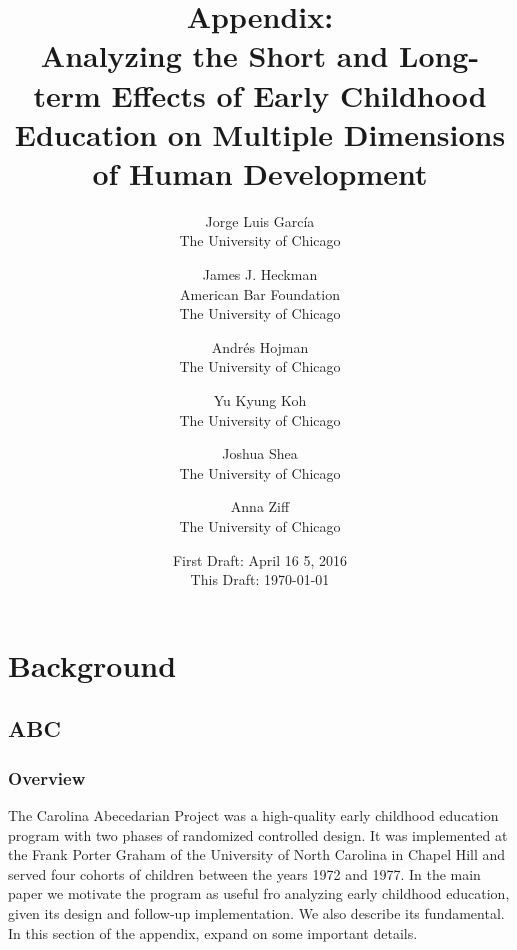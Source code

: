 




\title{\Large \textbf{Appendix: \\ Analyzing the Short and Long-term Effects of Early Childhood Education on Multiple Dimensions of Human Development}}

\author{
Jorge Luis Garc\'{i}a\\
The University of Chicago \and
James J. Heckman \\
American Bar Foundation \\
The University of Chicago \and
Andr\'{e}s Hojman\\
The University of Chicago \and
Yu Kyung Koh \\ 
The University of Chicago \and
Joshua Shea \\
The University of Chicago \and
Anna Ziff \\ 
The University of Chicago}
\date{First Draft: April 16 5, 2016\\ This Draft: \today}
\maketitle

\singlespacing
\pagebreak
\tableofcontents
\listoffigures
\listoftables
\pagebreak

\section{Background}

\subsection{ABC}

\subsubsection{Overview}

\noindent The Carolina Abecedarian Project was a high-quality early childhood education program with two phases of randomized controlled design. It was implemented at the Frank Porter Graham of the University of North Carolina in Chapel Hill and served four cohorts of children between the years 1972 and 1977. In the main paper we motivate the program as useful fro analyzing early childhood education, given its design and follow-up implementation. We also describe its fundamental. In this section of the appendix, expand on some important details.

